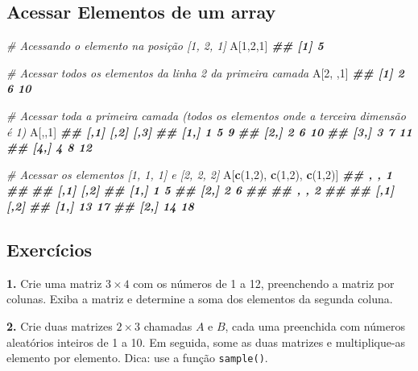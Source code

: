 \documentclass[
]{book}
\newenvironment{Shaded}{\begin{snugshade}}{\end{snugshade}}
\newcommand{\CommentTok}[1]{\textcolor[rgb]{0.56,0.35,0.01}{\textit{#1}}}
\newcommand{\DecValTok}[1]{\textcolor[rgb]{0.00,0.00,0.81}{#1}}
\newcommand{\DocumentationTok}[1]{\textcolor[rgb]{0.56,0.35,0.01}{\textbf{\textit{#1}}}}
\newcommand{\FunctionTok}[1]{\textcolor[rgb]{0.13,0.29,0.53}{\textbf{#1}}}
\newcommand{\NormalTok}[1]{#1}
\begin{document}
\subsection{Acessar Elementos de um array}\label{acessar-elementos-de-um-array}

\begin{Shaded}
\begin{Highlighting}[]
\CommentTok{\# Acessando o elemento na posição [1, 2, 1]}
\NormalTok{A[}\DecValTok{1}\NormalTok{,}\DecValTok{2}\NormalTok{,}\DecValTok{1}\NormalTok{]}
\DocumentationTok{\#\# [1] 5}

\CommentTok{\# Acessar todos os elementos da linha 2 da primeira camada}
\NormalTok{A[}\DecValTok{2}\NormalTok{, ,}\DecValTok{1}\NormalTok{]}
\DocumentationTok{\#\# [1]  2  6 10}

\CommentTok{\# Acessar toda a primeira camada (todos os elementos onde a terceira dimensão é 1)}
\NormalTok{A[,,}\DecValTok{1}\NormalTok{]}
\DocumentationTok{\#\#      [,1] [,2] [,3]}
\DocumentationTok{\#\# [1,]    1    5    9}
\DocumentationTok{\#\# [2,]    2    6   10}
\DocumentationTok{\#\# [3,]    3    7   11}
\DocumentationTok{\#\# [4,]    4    8   12}

\CommentTok{\# Acessar os elementos [1, 1, 1] e [2, 2, 2]}
\NormalTok{A[}\FunctionTok{c}\NormalTok{(}\DecValTok{1}\NormalTok{,}\DecValTok{2}\NormalTok{), }\FunctionTok{c}\NormalTok{(}\DecValTok{1}\NormalTok{,}\DecValTok{2}\NormalTok{), }\FunctionTok{c}\NormalTok{(}\DecValTok{1}\NormalTok{,}\DecValTok{2}\NormalTok{)]}
\DocumentationTok{\#\# , , 1}
\DocumentationTok{\#\# }
\DocumentationTok{\#\#      [,1] [,2]}
\DocumentationTok{\#\# [1,]    1    5}
\DocumentationTok{\#\# [2,]    2    6}
\DocumentationTok{\#\# }
\DocumentationTok{\#\# , , 2}
\DocumentationTok{\#\# }
\DocumentationTok{\#\#      [,1] [,2]}
\DocumentationTok{\#\# [1,]   13   17}
\DocumentationTok{\#\# [2,]   14   18}
\end{Highlighting}
\end{Shaded}

\subsection{Exercícios}\label{exercuxedcios-3}

\textbf{1.} Crie uma matriz \(3 \times 4\) com os números de 1 a 12,
preenchendo a matriz por colunas. Exiba a matriz e determine a soma dos
elementos da segunda coluna.

\textbf{2.} Crie duas matrizes \(2 \times 3\) chamadas \(A\) e \(B\), cada uma
preenchida com números aleatórios inteiros de 1 a 10. Em seguida, some
as duas matrizes e multiplique-as elemento por elemento. Dica: use a função \texttt{sample()}.
\end{document}

